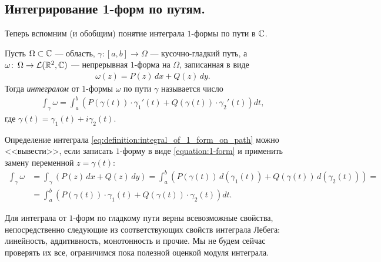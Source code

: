 \documentclass[../complex-analysis.tex]{subfiles}
\begin{document}
\subsection{Интегрирование 1-форм по путям.}

Теперь вспомним (и обобщим) понятие интеграла $1$-формы по пути в $\mathbb{C}$.

\begin{df}
 Пусть $\Omega \subset \mathbb{C}$ --- область, $\gamma \colon [a,b] \to \Omega$ --- кусочно-гладкий путь, а $\omega \colon\, \Omega \to \mathcal{L}(\mathbb{R}^2, \mathbb{C})$ --- непрерывная $1$-форма на $ \Omega $, записанная в виде
 \begin{align*}
  \omega(z) = P(z)\,dx + Q(z)\,dy.
 \end{align*} Тогда \textit{интегралом} от $1$-формы $\omega$ по пути  $\gamma$ называется число
 \begin{align}
  \label{eq:definition:integral_of_1_form_on_path}
  \int_{\gamma} \omega = \int_{a}^{b} \left( P(\gamma(t)) \cdot \gamma_1'(t) + Q(\gamma(t)) \cdot \gamma_2'(t) \right) dt,
 \end{align} где $\gamma(t) = \gamma_1(t) + i \gamma_2(t)$.
\end{df}
\begin{remrk*}
 Определение интеграла \eqref{eq:definition:integral_of_1_form_on_path} можно <<вывести>>, если записать $ 1 $-форму в виде \eqref{equation:1-form} и применить замену переменной $ z = \gamma(t) $:
 \begin{align*}
  \int_{\gamma} \omega &= \int_{\gamma} \left( P(z)\,dx + Q(z)\,dy \right) = \int_{a}^{b} (P(\gamma(t)) \, d (\gamma_1(t)) + Q(\gamma(t)) \, d(\gamma_2(t))) = \\
  &= \int_{a}^{b} \left( P(\gamma(t)) \cdot \gamma_1(t) + Q(\gamma(t)) \cdot \gamma_2(t)\right)dt.
 \end{align*}
\end{remrk*}

Для интеграла от $ 1 $-форм по гладкому пути верны всевозможные свойства, непосредственно следующие из соответствующих свойств интеграла Лебега: линейность, аддитивность, монотонность и прочие. Мы не будем сейчас проверять их все, ограничимся пока полезной оценкой модуля интеграла.
\end{document}
